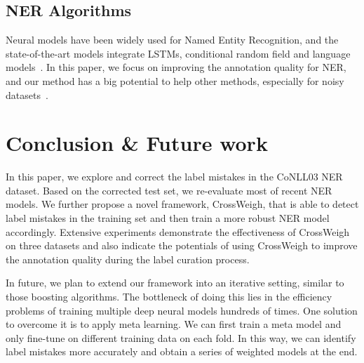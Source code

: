 \documentclass[11pt,a4paper]{article}
\newcommand{\our}{\mbox{\sf CrossWeigh}\xspace}
\begin{document}
\subsection{NER Algorithms}
Neural models have been widely used for Named Entity Recognition, and the state-of-the-art models integrate LSTMs, conditional random field and language models~\cite{lample2016neural, ma2016end, liu2018empower, peters2018deep, akbik2018contextual}. 
In this paper, we focus on improving the annotation quality for NER, and our method has a big potential to help other methods, especially for noisy datasets~\cite{shang2018learning}. 
 \section{Conclusion \& Future work}\label{sec:con}



In this paper, we explore and correct the label mistakes in the CoNLL03 NER dataset. 
Based on the corrected test set, we re-evaluate most of recent NER models.
We further propose a novel framework, \our, that is able to detect label mistakes in the training set and then train a more robust NER model accordingly.
Extensive experiments demonstrate the effectiveness of \our on three datasets and also indicate the potentials of using \our to improve the annotation quality during the label curation process.

In future, we plan to extend our framework into an iterative setting, similar to those boosting algorithms.
The bottleneck of doing this lies in the efficiency problems of training multiple deep neural models hundreds of times.
One solution to overcome it is to apply meta learning. 
We can first train a meta model and only fine-tune on different training data on each fold.
In this way, we can identify label mistakes more accurately and obtain a series of weighted models at the end.

%
 
\end{document}
